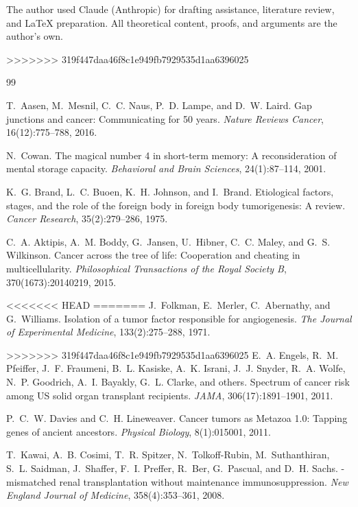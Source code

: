 \documentclass[11pt]{article}
\theoremstyle{definition}
\theoremstyle{remark}
\begin{document}
The author used Claude (Anthropic) for drafting assistance, literature review, and \LaTeX{} preparation. All theoretical content, proofs, and arguments are the author's own.

>>>>>>> 319f447daa46f8c1e949fb7929535d1aa6396025

\begin{thebibliography}{99}

T.~Aasen, M.~Mesnil, C.~C. Naus, P.~D. Lampe, and D.~W. Laird.
\newblock Gap junctions and cancer: Communicating for 50 years.
\newblock \emph{Nature Reviews Cancer}, 16(12):775--788, 2016.

N.~Cowan.
\newblock The magical number 4 in short-term memory: A reconsideration of
  mental storage capacity.
\newblock \emph{Behavioral and Brain Sciences}, 24(1):87--114, 2001.

K.~G. Brand, L.~C. Buoen, K.~H. Johnson, and I.~Brand.
\newblock Etiological factors, stages, and the role of the foreign body in
  foreign body tumorigenesis: A review.
\newblock \emph{Cancer Research}, 35(2):279--286, 1975.

C.~A. Aktipis, A.~M. Boddy, G.~Jansen, U.~Hibner, C.~C. Maley, and
  G.~S. Wilkinson.
\newblock Cancer across the tree of life: Cooperation and cheating in
  multicellularity.
\newblock \emph{Philosophical Transactions of the Royal Society B},
  370(1673):20140219, 2015.

<<<<<<< HEAD
=======
J.~Folkman, E.~Merler, C.~Abernathy, and G.~Williams.
\newblock Isolation of a tumor factor responsible for angiogenesis.
\newblock \emph{The Journal of Experimental Medicine}, 133(2):275--288, 1971.

>>>>>>> 319f447daa46f8c1e949fb7929535d1aa6396025
E.~A. Engels, R.~M. Pfeiffer, J.~F. Fraumeni, B.~L. Kasiske,
  A.~K. Israni, J.~J. Snyder, R.~A. Wolfe, N.~P. Goodrich,
  A.~I. Bayakly, G.~L. Clarke, and others.
\newblock Spectrum of cancer risk among {US} solid organ transplant
  recipients.
\newblock \emph{JAMA}, 306(17):1891--1901, 2011.

P.~C.~W. Davies and C.~H. Lineweaver.
\newblock Cancer tumors as {Metazoa} 1.0: Tapping genes of ancient ancestors.
\newblock \emph{Physical Biology}, 8(1):015001, 2011.

T.~Kawai, A.~B. Cosimi, T.~R. Spitzer, N.~Tolkoff-Rubin, M.~Suthanthiran,
  S.~L. Saidman, J.~Shaffer, F.~I. Preffer, R.~Ber, G.~Pascual, and
  D.~H. Sachs.
-mismatched renal transplantation without maintenance
  immunosuppression.
\newblock \emph{New England Journal of Medicine}, 358(4):353--361, 2008.


\end{thebibliography}
\end{document}
